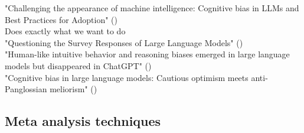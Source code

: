"Challenging the appearance of machine intelligence: Cognitive bias in LLMs and Best Practices for Adoption" (\cite{talboy2023challenging}) \\
Does exactly what we want to do \\
"Questioning the Survey Responses of Large Language Models" (\cite{dominguez2023questioning}) \\
"Human-like intuitive behavior and reasoning biases emerged in large language models but disappeared in ChatGPT" (\cite{hagendorff2023human}) \\
"Cognitive bias in large language models: Cautious optimism meets anti-Panglossian meliorism" (\cite{thorstad2023cognitive}) \\

\subsection{Meta analysis techniques}